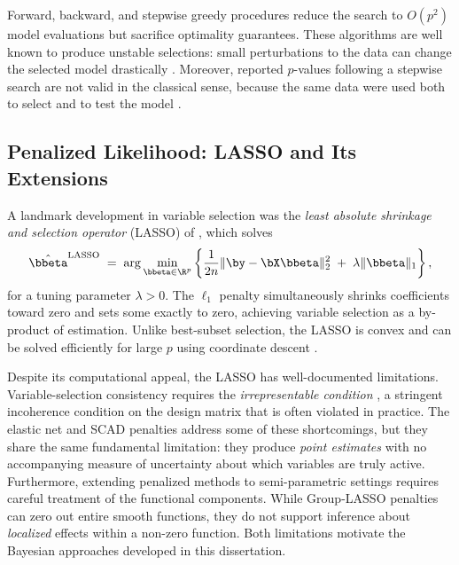 Forward, backward, and stepwise greedy procedures reduce the search to
$O(p^2)$ model evaluations but sacrifice optimality guarantees. These
algorithms are well known to produce unstable selections: small
perturbations to the data can change the selected model drastically
\citep{breiman1996stability}. Moreover, reported $p$-values following a
stepwise search are not valid in the classical sense, because the same
data were used both to select and to test the model \citep{berk2013valid}.

\subsection{Penalized Likelihood: LASSO and Its Extensions}
\label{subsec:lasso}

A landmark development in variable selection was the \emph{least absolute
shrinkage and selection operator} (LASSO) of \citet{tibshirani1996lasso},
which solves
\begin{equation}
  \hat{\bbeta}^{\mathrm{LASSO}}
  \;=\;
  \arg\min_{\bbeta \in \R^p}
  \left\{
    \frac{1}{2n}\|\by - \bX\bbeta\|_2^2
    \;+\; \lambda\|\bbeta\|_1
  \right\},
  \label{eq:lasso}
\end{equation}
for a tuning parameter $\lambda > 0$. The $\ell_1$ penalty simultaneously
shrinks coefficients toward zero and sets some exactly to zero, achieving
variable selection as a by-product of estimation. Unlike best-subset
selection, the LASSO is convex and can be solved efficiently for large $p$
using coordinate descent \citep{friedman2010glmnet}.

Despite its computational appeal, the LASSO has well-documented
limitations. Variable-selection consistency requires the
\emph{irrepresentable condition} \citep{zhao2006irrepresentable}, a
stringent incoherence condition on the design matrix that is often violated
in practice. The elastic net \citep{zou2005elasticnet} and SCAD
\citep{fan2001scad} penalties address some of these shortcomings, but they
share the same fundamental limitation: they produce \emph{point estimates}
with no accompanying measure of uncertainty about which variables are truly
active. Furthermore, extending penalized methods to semi-parametric
settings requires careful treatment of the functional components.
While Group-LASSO penalties \citep{yuan2006grouplasso} can zero out entire smooth
functions, they do not support inference about \emph{localized} effects
within a non-zero function. Both limitations motivate the Bayesian
approaches developed in this dissertation.

